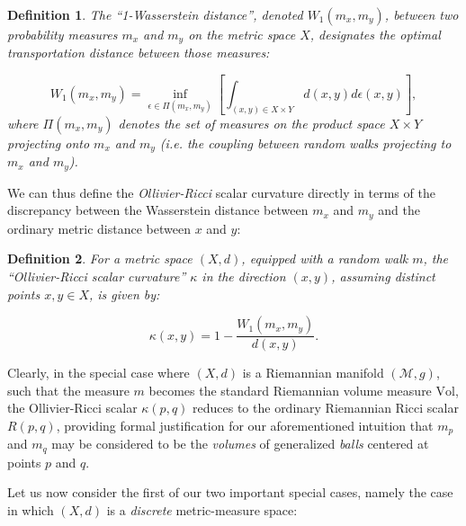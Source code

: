 \documentclass{article}
\newtheorem{definition}{Definition}
\begin{document}
\begin{definition}
The ``1-Wasserstein distance'', denoted ${W_1 \left( m_x, m_y \right)}$, between two probability measures ${m_x}$ and ${m_y}$ on the metric space $X$, designates the optimal transportation distance between those measures:

\begin{equation}
W_1 \left( m_x, m_y \right) = \inf_{\epsilon \in \Pi \left( m_x, m_y \right)} \left[ \int_{\left( x, y \right) \in X \times Y} d \left( x, y \right) d \epsilon \left( x, y \right) \right],
\end{equation}
where ${\Pi \left( m_x, m_y \right)}$ denotes the set of measures on the product space ${X \times Y}$ projecting onto ${m_x}$ and ${m_y}$ (i.e. the coupling between random walks projecting to ${m_x}$ and ${m_y}$).
\end{definition}
We can thus define the \textit{Ollivier-Ricci} scalar curvature directly in terms of the discrepancy between the Wasserstein distance between ${m_x}$ and ${m_y}$ and the ordinary metric distance between $x$ and $y$:

\begin{definition}
For a metric space ${\left( X, d \right)}$, equipped with a random walk $m$, the ``Ollivier-Ricci scalar curvature'' ${\kappa}$ in the direction ${\left( x, y \right)}$, assuming distinct points ${x, y \in X}$, is given by:

\begin{equation}
\kappa \left( x, y \right) = 1 - \frac{W_1 \left( m_x, m_y \right)}{d \left( x, y \right)}.
\end{equation}
\end{definition}
Clearly, in the special case where ${\left( X, d \right)}$ is a Riemannian manifold ${\left( \mathcal{M}, g \right)}$, such that the measure $m$ becomes the standard Riemannian volume measure ${\mathrm{Vol}}$, the Ollivier-Ricci scalar ${\kappa \left( p, q \right)}$ reduces to the ordinary Riemannian Ricci scalar ${R \left( p, q \right)}$, providing formal justification for our aforementioned intuition that ${m_p}$ and ${m_q}$ may be considered to be the \textit{volumes} of generalized \textit{balls} centered at points $p$ and $q$.

Let us now consider the first of our two important special cases, namely the case in which ${\left( X, d \right)}$ is a \textit{discrete} metric-measure space:
\end{document}

